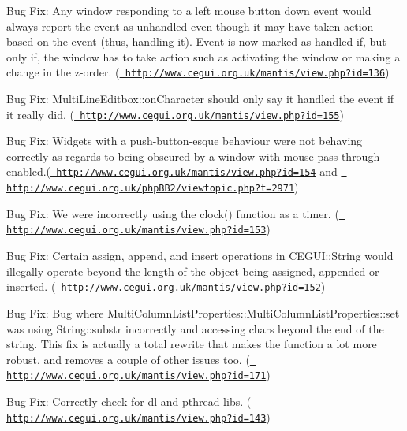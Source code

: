 \begin{DoxyItemize}
\item Bug Fix\+: Any window responding to a left mouse button down event would always report the event as \textquotesingle{}unhandled\textquotesingle{} even though it may have taken action based on the event (thus, handling it). Event is now marked as \textquotesingle{}handled\textquotesingle{} if, but only if, the window has to take action such as activating the window or making a change in the z-\/order. (\href{http://www.cegui.org.uk/mantis/view.php?id=136}{\texttt{ http\+://www.\+cegui.\+org.\+uk/mantis/view.\+php?id=136}})
\item Bug Fix\+: Multi\+Line\+Editbox\+::on\+Character should only say it handled the event if it really did. (\href{http://www.cegui.org.uk/mantis/view.php?id=155}{\texttt{ http\+://www.\+cegui.\+org.\+uk/mantis/view.\+php?id=155}})
\item Bug Fix\+: Widgets with a push-\/button-\/esque behaviour were not behaving correctly as regards to being obscured by a window with mouse pass through enabled.(\href{http://www.cegui.org.uk/mantis/view.php?id=154}{\texttt{ http\+://www.\+cegui.\+org.\+uk/mantis/view.\+php?id=154}} and \href{http://www.cegui.org.uk/phpBB2/viewtopic.php?t=2971}{\texttt{ http\+://www.\+cegui.\+org.\+uk/php\+B\+B2/viewtopic.\+php?t=2971}})
\item Bug Fix\+: We were incorrectly using the clock() function as a timer. (\href{http://www.cegui.org.uk/mantis/view.php?id=153}{\texttt{ http\+://www.\+cegui.\+org.\+uk/mantis/view.\+php?id=153}})
\item Bug Fix\+: Certain assign, append, and insert operations in C\+E\+G\+U\+I\+::\+String would illegally operate beyond the length of the object being assigned, appended or inserted. (\href{http://www.cegui.org.uk/mantis/view.php?id=152}{\texttt{ http\+://www.\+cegui.\+org.\+uk/mantis/view.\+php?id=152}})
\item Bug Fix\+: Bug where Multi\+Column\+List\+Properties\+::\+Multi\+Column\+List\+Properties\+::set was using String\+::substr incorrectly and accessing chars beyond the end of the string. This fix is actually a total rewrite that makes the function a lot more robust, and removes a couple of other issues too. (\href{http://www.cegui.org.uk/mantis/view.php?id=171}{\texttt{ http\+://www.\+cegui.\+org.\+uk/mantis/view.\+php?id=171}})
\item Bug Fix\+: Correctly check for dl and pthread libs. (\href{http://www.cegui.org.uk/mantis/view.php?id=143}{\texttt{ http\+://www.\+cegui.\+org.\+uk/mantis/view.\+php?id=143}})

\end{DoxyItemize}

